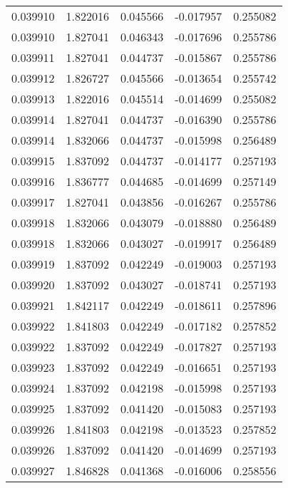 \begin{tabular}{lrrrr}
0.039910    &  1.822016 &  0.045566 & -0.017957 &             0.255082 \\
0.039910    &  1.827041 &  0.046343 & -0.017696 &             0.255786 \\
0.039911    &  1.827041 &  0.044737 & -0.015867 &             0.255786 \\
0.039912    &  1.826727 &  0.045566 & -0.013654 &             0.255742 \\
0.039913    &  1.822016 &  0.045514 & -0.014699 &             0.255082 \\
0.039914    &  1.827041 &  0.044737 & -0.016390 &             0.255786 \\
0.039914    &  1.832066 &  0.044737 & -0.015998 &             0.256489 \\
0.039915    &  1.837092 &  0.044737 & -0.014177 &             0.257193 \\
0.039916    &  1.836777 &  0.044685 & -0.014699 &             0.257149 \\
0.039917    &  1.827041 &  0.043856 & -0.016267 &             0.255786 \\
0.039918    &  1.832066 &  0.043079 & -0.018880 &             0.256489 \\
0.039918    &  1.832066 &  0.043027 & -0.019917 &             0.256489 \\
0.039919    &  1.837092 &  0.042249 & -0.019003 &             0.257193 \\
0.039920    &  1.837092 &  0.043027 & -0.018741 &             0.257193 \\
0.039921    &  1.842117 &  0.042249 & -0.018611 &             0.257896 \\
0.039922    &  1.841803 &  0.042249 & -0.017182 &             0.257852 \\
0.039922    &  1.837092 &  0.042249 & -0.017827 &             0.257193 \\
0.039923    &  1.837092 &  0.042249 & -0.016651 &             0.257193 \\
0.039924    &  1.837092 &  0.042198 & -0.015998 &             0.257193 \\
0.039925    &  1.837092 &  0.041420 & -0.015083 &             0.257193 \\
0.039926    &  1.841803 &  0.042198 & -0.013523 &             0.257852 \\
0.039926    &  1.837092 &  0.041420 & -0.014699 &             0.257193 \\
0.039927    &  1.846828 &  0.041368 & -0.016006 &             0.258556 \\

\end{tabular}
